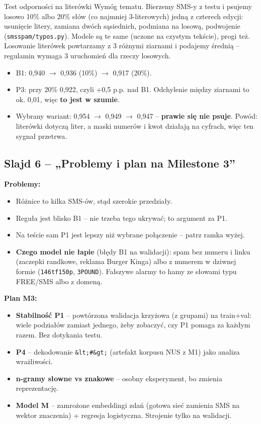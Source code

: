 \documentclass[11pt,a4paper]{article}
\begin{document}
\begin{pojecie}{Test odporności na literówki}
Wymóg tematu. Bierzemy SMS-y z testu i psujemy losowo 10\% albo 20\% słów (co najmniej 3-literowych) jedną z czterech
edycji: usunięcie litery, zamiana dwóch sąsiednich, podmiana na losową, podwojenie (\texttt{smsspam/typos.py}). Modele są
te same (uczone na czystym tekście), progi też. Losowanie literówek powtarzamy z 3 różnymi ziarnami i podajemy średnią
-- regulamin wymaga 3 uruchomień dla rzeczy losowych.
\end{pojecie}

\begin{itemize}
  \item B1: 0,940 $\to$ 0,936 (10\%) $\to$ 0,917 (20\%).
  \item P3: przy 20\% 0,922, czyli +0,5 p.p. nad B1. Odchylenie między ziarnami to ok. 0,01, więc \textbf{to jest w szumie}.
  \item Wybrany wariant: 0,954 $\to$ 0,949 $\to$ 0,947 -- \textbf{prawie się nie psuje}. Powód: literówki dotyczą liter,
        a maski numerów i kwot działają na cyfrach, więc ten sygnał przetrwa.
\end{itemize}

\subsection{Slajd 6 -- „Problemy i plan na Milestone 3”}

\textbf{Problemy:}
\begin{itemize}
  \item Różnice to kilka SMS-ów, stąd szerokie przedziały.
  \item Reguła jest blisko B1 -- nie trzeba tego ukrywać; to argument za P1.
  \item Na teście sam P1 jest lepszy niż wybrane połączenie -- patrz ramka wyżej.
  \item \textbf{Czego model nie łapie} (błędy B1 na walidacji): spam bez numeru i linku (zaczepki randkowe, reklama
        Burger Kinga) albo z numerem w dziwnej formie (\texttt{146tf150p}, \texttt{3POUND}). Fałszywe alarmy to hamy ze
        słowami typu FREE/SMS albo z domeną.
\end{itemize}

\textbf{Plan M3:}
\begin{itemize}
  \item \textbf{Stabilność P1} -- powtórzona walidacja krzyżowa (z grupami) na train+val: wiele podziałów zamiast jednego,
        żeby zobaczyć, czy P1 pomaga za każdym razem. Bez dotykania testu.
  \item \textbf{P4} -- dekodowanie \texttt{\&lt;\#\&gt;} (artefakt korpusu NUS z M1) jako analiza wrażliwości.
  \item \textbf{n-gramy słowne vs znakowe} -- osobny eksperyment, bo zmienia reprezentację.
  \item \textbf{Model M} -- zamrożone embeddingi zdań (gotowa sieć zamienia SMS na wektor znaczenia) + regresja
        logistyczna. Strojenie tylko na walidacji.
\end{itemize}
\end{document}
